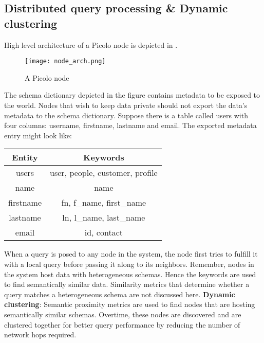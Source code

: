 \subsection{Distributed query processing \& Dynamic clustering} \label{sec:dynamic_cluster}
High level architecture of a \textsf{Picolo} node is depicted in .
\begin{figure}[h!] \centering
	\texttt{[image: node\_arch.png]}
	\caption{A Picolo node}
	\label{fig:node_arch}
\end{figure}
The schema dictionary depicted in the figure contains metadata to be exposed to the world. Nodes that wish to keep data private should not export the data's metadata to the schema dictionary. Suppose there is a table called \textsf{users} with four columns: \textsf{username}, \textsf{firstname}, \textsf{lastname} and \textsf{email}. The exported metadata entry might look like:
\begin{center}
	\begin{tabular}{| c | c |} 
		\hline
		Entity & Keywords \\ [0.5ex] 
		\hline
		\textsf{users} & user, people, customer, profile\\ 
		\hline
		\textsf{name} & name \\
		\hline
		\textsf{firstname} & fn, {f\_name}, {first\_name} \\
		\hline
		\textsf{lastname} & ln, {l\_name}, {last\_name} \\
		\hline
		\textsf{email} & id, contact \\ [1ex] 
		\hline
	\end{tabular}
\end{center}
When a query is posed to any node in the system, the node first tries to fulfill it with a local query before passing it along to its neighbors. Remember, nodes in the system host data with heterogeneous schemas. Hence the keywords are used to find semantically similar data. Similarity metrics that determine whether a query matches a heterogeneous schema are not discussed here.
\newline\newline
\textbf{Dynamic clustering}:
Semantic proximity metrics are used to find nodes that are hosting semantically similar schemas. Overtime, these nodes are discovered and are clustered together for better query performance by reducing the number of network hops required.


